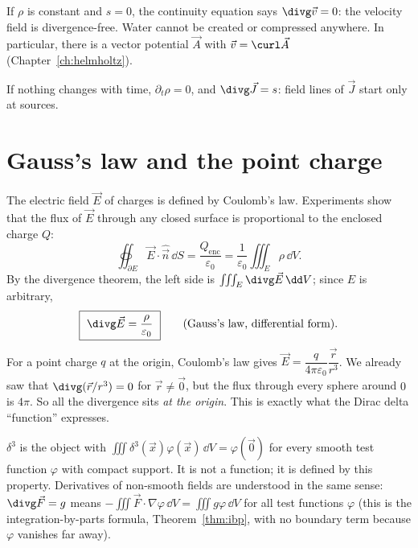 \begin{example}
If $\rho$ is constant and $s=0$, the continuity equation says $\divg\vec v=0$: the velocity field is divergence-free. Water cannot be created or compressed anywhere. In particular, there is a vector potential $\vec A$ with $\vec v=\curl\vec A$ (Chapter~\ref{ch:helmholtz}).
\end{example}

\begin{example}
If nothing changes with time, $\partial_t\rho=0$, and $\divg\vec J=s$: field lines of $\vec J$ start only at sources.
\end{example}

\section{Gauss's law and the point charge}

The electric field $\vec E$ of charges is defined by Coulomb's law. Experiments show that the flux of $\vec E$ through any closed surface is proportional to the enclosed charge $Q$:
\[
\oiint_{\partial E}\vec E\cdot\hat{\vec n}\,\dd S=\frac{Q_{\text{enc}}}{\varepsilon_0}=\frac1{\varepsilon_0}\iiint_E\rho\,\dd V .
\]
By the divergence theorem, the left side is $\iiint_E\divg\vec E\,\dd V$; since $E$ is arbitrary,
\[
\boxed{\ \divg\vec E=\frac\rho{\varepsilon_0}\ }\qquad\text{(Gauss's law, differential form).}
\]
For a point charge $q$ at the origin, Coulomb's law gives $\vec E=\dfrac q{4\pi\varepsilon_0}\dfrac{\vec r}{r^3}$. We already saw that $\divg(\vec r/r^3)=0$ for $\vec r\ne\vec 0$, but the flux through every sphere around $0$ is $4\pi$. So all the divergence sits \emph{at the origin}. This is exactly what the Dirac delta ``function'' expresses.

\begin{definition}
$\delta^3$ is the object with $\iiint\delta^3(\vec x)\varphi(\vec x)\,\dd V=\varphi(\vec 0)$ for every smooth test function $\varphi$ with compact support. It is not a function; it is defined by this property. Derivatives of non-smooth fields are understood in the same sense: $\divg\vec F=g$ means $-\iiint\vec F\cdot\nabla\varphi\,\dd V=\iiint g\varphi\,\dd V$ for all test functions $\varphi$ (this is the integration-by-parts formula, Theorem~\ref{thm:ibp}, with no boundary term because $\varphi$ vanishes far away).
\end{definition}

